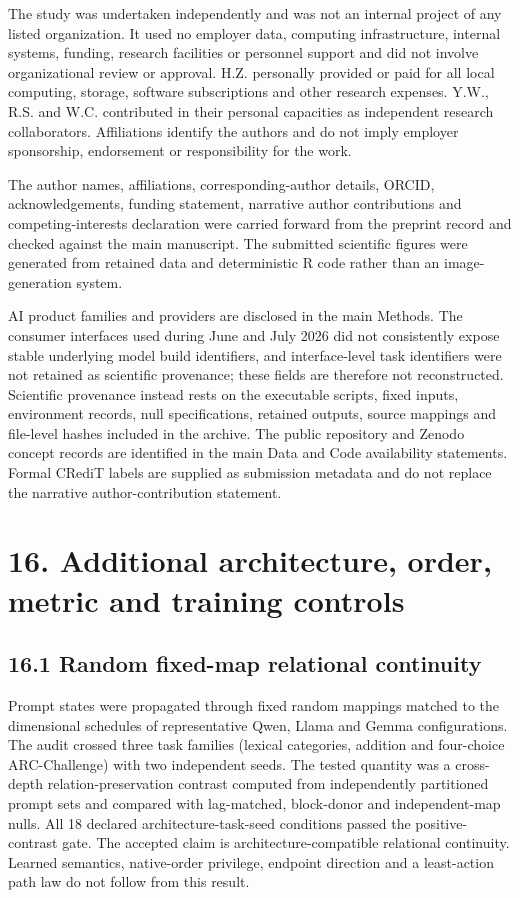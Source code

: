 \documentclass[10pt]{article}
\begin{document}
The study was undertaken independently and was not an internal project of any listed organization. It used no employer data, computing infrastructure, internal systems, funding, research facilities or personnel support and did not involve organizational review or approval. H.Z. personally provided or paid for all local computing, storage, software subscriptions and other research expenses. Y.W., R.S. and W.C. contributed in their personal capacities as independent research collaborators. Affiliations identify the authors and do not imply employer sponsorship, endorsement or responsibility for the work.

The author names, affiliations, corresponding-author details, ORCID, acknowledgements, funding statement, narrative author contributions and competing-interests declaration were carried forward from the preprint record and checked against the main manuscript. The submitted scientific figures were generated from retained data and deterministic R code rather than an image-generation system.

AI product families and providers are disclosed in the main Methods. The consumer interfaces used during June and July 2026 did not consistently expose stable underlying model build identifiers, and interface-level task identifiers were not retained as scientific provenance; these fields are therefore not reconstructed. Scientific provenance instead rests on the executable scripts, fixed inputs, environment records, null specifications, retained outputs, source mappings and file-level hashes included in the archive. The public repository and Zenodo concept records are identified in the main Data and Code availability statements. Formal CRediT labels are supplied as submission metadata and do not replace the narrative author-contribution statement.

\section*{16. Additional architecture, order, metric and training controls}

\subsection*{16.1 Random fixed-map relational continuity}

Prompt states were propagated through fixed random mappings matched to the dimensional schedules of representative Qwen, Llama and Gemma configurations. The audit crossed three task families (lexical categories, addition and four-choice ARC-Challenge) with two independent seeds. The tested quantity was a cross-depth relation-preservation contrast computed from independently partitioned prompt sets and compared with lag-matched, block-donor and independent-map nulls. All 18 declared architecture-task-seed conditions passed the positive-contrast gate. The accepted claim is architecture-compatible relational continuity. Learned semantics, native-order privilege, endpoint direction and a least-action path law do not follow from this result.
\end{document}
